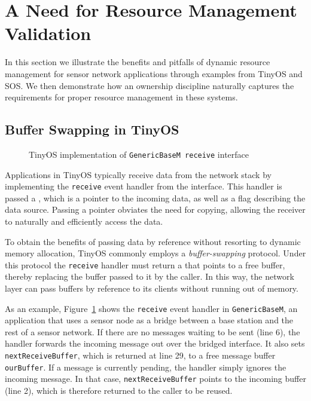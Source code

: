 \section{A Need for Resource Management Validation}

In this section we illustrate the benefits and pitfalls of dynamic resource
management for sensor network applications through examples from TinyOS and
SOS.  
%
We then demonstrate how an ownership discipline naturally captures the
requirements for proper resource management in these systems.


\subsection{Buffer Swapping in TinyOS}

\begin{figure}[t]

\caption{TinyOS implementation of {\tt GenericBaseM receive}
interface\label{fig:genericbase}}
\end{figure}



Applications in TinyOS typically receive data from the network stack by
implementing the {\tt receive} event handler from the 
interface.  
%
This handler is passed a , which is a pointer to the
incoming data, as well as a flag describing the data source.  
%
Passing a pointer obviates the need for copying, allowing the receiver to
naturally and efficiently access the data.



To obtain the benefits of passing data by reference without resorting to
dynamic memory allocation, TinyOS commonly employs a {\em buffer-swapping}
protocol.  
%
Under this protocol the {\tt receive} handler must return a
 that points to a free buffer, thereby replacing the
buffer passed to it by the caller.
%
In this way, the network layer can pass buffers by reference to its clients
without running out of memory.



As an example, Figure~\ref{fig:genericbase} shows the {\tt receive} event
handler in {\tt GenericBaseM}, an application that uses a sensor node as a
bridge between a base station and the rest of a sensor network.  
%
If there are no messages waiting to be sent (line 6), the handler forwards
the incoming message out over the bridged interface.  
%
It also sets {\tt nextReceiveBuffer}, which is returned at line 29, to a
free message buffer {\tt ourBuffer}.  
%
If a message is currently pending, the handler simply ignores the incoming
message.  
%
In that case, {\tt nextReceiveBuffer} points to the incoming buffer (line
2), which is therefore returned to the caller to be reused.



